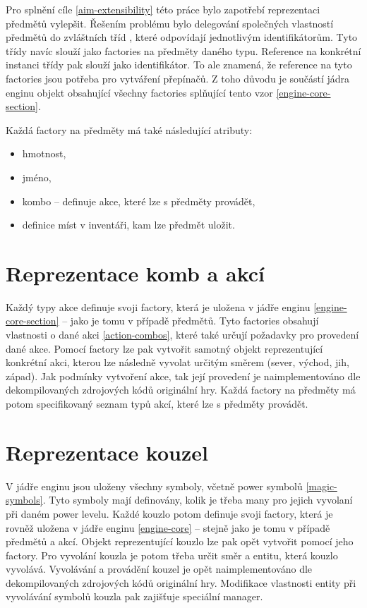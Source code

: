 Pro splnění cíle \ref{aim-extensibility} této práce bylo zapotřebí reprezentaci předmětů vylepšit.
Řešením problému bylo delegování společných vlastností předmětů do zvláštních tříd , které odpovídají jednotlivým identifikátorům.
Tyto třídy navíc slouží jako factories na předměty daného typu. Reference na konkrétní instanci třídy pak slouží jako identifikátor.
To ale znamená, že reference na tyto factories jsou potřeba pro vytváření přepínačů. Z toho důvodu je součástí jádra enginu
objekt obsahující všechny factories splňující tento vzor \vref{engine-core-section}.


Každá factory na předměty má také následující atributy:
\begin{itemize}
\item hmotnost, 
\item jméno, 
\item kombo -- definuje akce, které lze s předměty provádět,  
\item definice míst v inventáři, kam lze předmět uložit. 
\end{itemize}

\section{Reprezentace komb a akcí}
Každý typy akce definuje svoji factory, která je uložena v jádře enginu \vref{engine-core-section} -- jako je tomu v případě předmětů.
Tyto factories obsahují vlastnosti o dané akci \vref{action-combos}, které také určují požadavky pro provedení dané akce.
Pomocí factory lze pak vytvořit samotný objekt reprezentující konkrétní akci, kterou lze následně vyvolat určitým 
směrem (sever, východ, jih, západ). Jak podmínky vytvoření akce, tak její provedení je naimplementováno dle dekompilovaných
zdrojových kódů \cite{DMDecompilation} originální hry. Každá factory na předměty má potom specifikovaný seznam typů akcí,
které lze s předměty provádět.

\section{Reprezentace kouzel}
V jádře enginu jsou uloženy všechny symboly, včetně power symbolů \vref{magic-symbols}.
Tyto symboly mají definovány, kolik je třeba many pro jejich vyvolaní při daném power levelu.
Každé kouzlo potom definuje svoji factory, která je rovněž uložena v jádře enginu \vref{engine-core} -- stejně jako je tomu v případě předmětů a akcí.
Objekt reprezentující kouzlo lze pak opět vytvořit pomocí jeho factory. Pro vyvolání kouzla je potom třeba určit směr a entitu,
která kouzlo vyvolává. Vyvolávání a provádění kouzel je opět naimplementováno dle dekompilovaných
zdrojových kódů \cite{DMDecompilation} originální hry. Modifikace vlastnosti entity při vyvolávání symbolů
kouzla pak zajišťuje speciální manager. 

